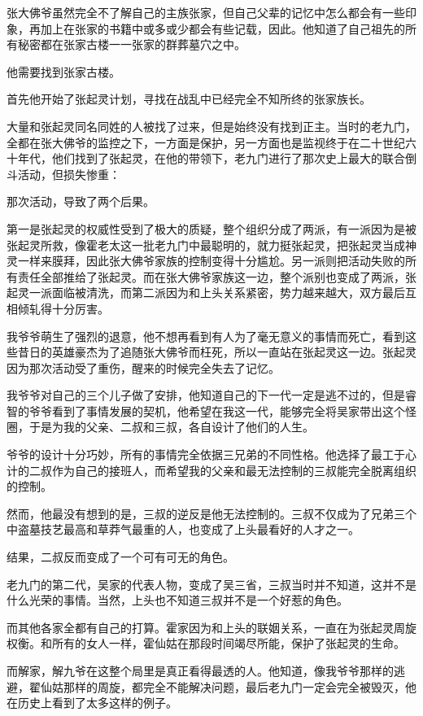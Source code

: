 张大佛爷虽然完全不了解自己的主族张家，但自己父辈的记忆中怎么都会有一些印象，再加上在张家的书籍中或多或少都会有些记载，因此。他知道了自己祖先的所有秘密都在张家古楼一一张家的群葬墓穴之中。

他需要找到张家古楼。

首先他开始了张起灵计划，寻找在战乱中已经完全不知所终的张家族长。

大量和张起灵同名同姓的人被找了过来，但是始终没有找到正主。当时的老九门，全都在张大佛爷的监控之下，一方面是保护，另一方面也是监视终于在二十世纪六十年代，他们找到了张起灵，在他的带领下，老九门进行了那次史上最大的联合倒斗活动，但损失惨重：

那次活动，导致了两个后果。

第一是张起灵的权威性受到了极大的质疑，整个组织分成了两派，有一派因为是被张起灵所救，像霍老太这一批老九门中最聪明的，就力挺张起灵，把张起灵当成神灵一样来膜拜，因此张大佛爷家族的控制变得十分尴尬。另一派则把活动失败的所有责任全部推给了张起灵。而在张大佛爷家族这一边，整个派别也变成了两派，张起灵一派面临被清洗，而第二派因为和上头关系紧密，势力越来越大，双方最后互相倾轧得十分厉害。

我爷爷萌生了强烈的退意，他不想再看到有人为了毫无意义的事情而死亡，看到这些昔日的英雄豪杰为了追随张大佛爷而枉死，所以一直站在张起灵这一边。张起灵因为那次活动受了重伤，醒来的时候完全失去了记忆。

我爷爷对自己的三个儿子做了安排，他知道自己的下一代一定是逃不过的，但是睿智的爷爷看到了事情发展的契机，他希望在我这一代，能够完全将吴家带出这个怪圈，于是为我的父亲、二叔和三叔，各自设计了他们的人生。

爷爷的设计十分巧妙，所有的事情完全依据三兄弟的不同性格。他选择了最工于心计的二叔作为自己的接班人，而希望我的父亲和最无法控制的三叔能完全脱离组织的控制。

然而，他最没有想到的是，三叔的逆反是他无法控制的。三叔不仅成为了兄弟三个中盗墓技艺最高和草莽气最重的人，也变成了上头最看好的人才之一。

结果，二叔反而变成了一个可有可无的角色。

老九门的第二代，吴家的代表人物，变成了吴三省，三叔当时并不知道，这并不是什么光荣的事情。当然，上头也不知道三叔并不是一个好惹的角色。

而其他各家全都有自己的打算。霍家因为和上头的联姻关系，一直在为张起灵周旋权衡。和所有的女人一样，霍仙姑在那段时间竭尽所能，保护了张起灵的生命。

而解家，解九爷在这整个局里是真正看得最透的人。他知道，像我爷爷那样的逃避，翟仙姑那样的周旋，都完全不能解决问题，最后老九门一定会完全被毁灭，他在历史上看到了太多这样的例子。

